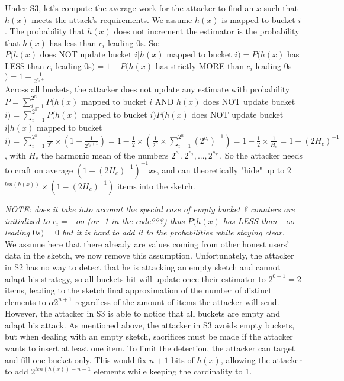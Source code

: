 \documentclass{IEEEtran}
\begin{document}
Under S3, let's compute the average work for the attacker to find an $x$ such that $h(x)$ meets the attack's requirements. We assume $h(x)$ is mapped to bucket $i$. The probability that $h(x)$ does not increment the estimator is the probability that $h(x)$ has less than $c_i$ leading 0s. So:\\
$P(h(x)$ does NOT update bucket $i| h(x)$ mapped to bucket $i)=P(h(x)$ has LESS than $c_i$ leading 0s$)=1-P(h(x)$ has strictly MORE than $c_i$ leading 0s$)=1-\frac{1}{2^{c_i+1}}$\\
Across all buckets, the attacker does not update any estimate with probability $P=
\sum_{i=1}^{2^n}P(h(x)$ mapped to bucket $i$ AND $h(x)$ does NOT update bucket $i) = \sum_{i=1}^{2^n}P(h(x)$ mapped to bucket $i)P(h(x)$ does NOT update bucket $i| h(x)$ mapped to bucket $i) = \sum_{i=1}^{2^n}\frac{1}{2^n} \times (1-\frac{1}{2^{c_i+1}}) = 1-\frac{1}{2}\times(\frac{1}{2^n}\times \sum_{i=1}^{2^n} {(2^{c_i})}^{-1}) = 1-\frac{1}{2}\times\frac{1}{H_c} = 1-(2H_c)^{-1}$, with $H_c$ the harmonic mean of the numbers $2^{c_1}, 2^{c_2}, ..., 2^{c_{2^n}}$.
So the attacker needs to craft on average $(1-(2H_c)^{-1})^{-1} x$s, and can theoretically "hide" up to 2$^{len(h(x))}\times (1-(2H_c)^{-1})$ items into the sketch.

\textit{NOTE: does it take into account the special case of empty bucket ? counters are initialized to $c_i=-oo$ (or -1 in the code???) thus $P(h(x)$ has LESS than $-oo$ leading $0s) = 0$ but it is hard to add it to the probabilities while staying clear.}\\

We assume here that there already are values coming from other honest users' data in the sketch, we now remove this assumption. Unfortunately, the attacker in S2 has no way to detect that he is attacking an empty sketch and cannot adapt his strategy, so all buckets hit will update once their estimator to $2^{0+1}=2$ items, leading to the sketch final approximation of the number of distinct elements to $\alpha2^{n+1}$ regardless of the amount of items the attacker will send. However, the attacker in S3 is able to notice that all buckets are empty and adapt his attack. As mentioned above, the attacker in S3 avoids empty buckets, but when dealing with an empty sketch, sacrifices must be made if the attacker wants to insert at least one item. To limit the detection, the attacker can target and fill one bucket only. This would fix $n+1$ bits of $h(x)$, allowing the attacker to add $2^{len(h(x))-n-1}$ elements while keeping the cardinality to 1.
\end{document}
